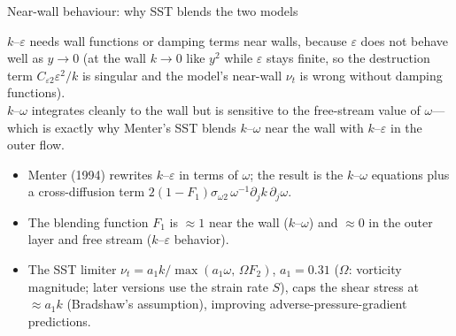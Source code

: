 \documentclass[aspectratio=169,11pt]{beamer}
\begin{document}
\begin{frame}{Near-wall behaviour: why SST blends the two models}
\begin{punchbox}
$k$--$\varepsilon$ needs wall functions or damping terms near walls, because $\varepsilon$ does not behave well as $y\to0$ (at the wall $k\to0$ like $y^2$ while $\varepsilon$ stays finite, so the destruction term $C_{\varepsilon2}\varepsilon^2/k$ is singular and the model's near-wall $\nu_t$ is wrong without damping functions).\\[3pt]
$k$--$\omega$ integrates cleanly to the wall but is sensitive to the free-stream value of $\omega$---which is exactly why Menter's SST blends $k$--$\omega$ near the wall with $k$--$\varepsilon$ in the outer flow.
\end{punchbox}

\begin{itemize}\itemsep4pt
  \item Menter (1994) rewrites $k$--$\varepsilon$ in terms of $\omega$; the result is the $k$--$\omega$ equations plus a cross-diffusion term $2(1-F_1)\sigma_{\omega2}\,\omega^{-1}\partial_jk\,\partial_j\omega$.
  \item The blending function $F_1$ is $\approx1$ near the wall ($k$--$\omega$) and $\approx0$ in the outer layer and free stream ($k$--$\varepsilon$ behavior).
  \item The SST limiter $\nu_t=a_1k/\max(a_1\omega,\,\Omega F_2)$, $a_1=0.31$ ($\Omega$: vorticity magnitude; later versions use the strain rate $S$), caps the shear stress at $\approx a_1k$ (Bradshaw's assumption), improving adverse-pressure-gradient predictions.
\end{itemize}
\end{frame}
\end{document}
